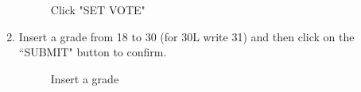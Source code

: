 \documentclass[ManualeUtente]{subfiles}
\begin{document}
\begin{enumerate}
\begin{figure}[H]
		\caption{Click "SET VOTE"}
		\label{fig:Click "SET VOTE"}
	\end{figure}
	\item Insert a grade from 18 to 30 (for 30L write 31) and then click on the \textquotedblleft SUBMIT" button to confirm.
	\begin{figure}[H]
		\centering
		\caption{Insert a grade}
		\label{fig:Insert a grade}
	\end{figure}
\end{enumerate}
\end{document}
